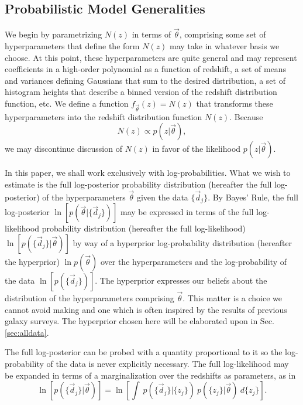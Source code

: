 \documentclass[preprint]{aastex}
\begin{document}
%
\subsection{Probabilistic Model Generalities}
\label{sec:prob}

We begin by parametrizing $N(z)$ in terms of $\vec{\theta}$, comprising some 
set of hyperparameters that define the form $N(z)$ may take in whatever basis 
we choose.  At this point, these hyperparameters are quite general and may 
represent coefficients in a high-order polynomial as a function of redshift, a 
set of means and variances defining Gaussians that sum to the desired 
distribution, a set of histogram heights that describe a binned version of the 
redshift distribution function, etc.  We define a function 
$f_{\vec{\theta}}(z)=N(z)$ that transforms these hyperparameters into the 
redshift distribution function $N(z)$.  Because 
\begin{equation}
\label{eq:definition}
N(z)\propto p(z|\vec{\theta}),
\end{equation}
we may discontinue discussion of $N(z)$ in favor of the likelihood 
$p(z|\vec{\theta})$.

In this paper, we shall work exclusively with log-probabilities.  What we wish 
to estimate is the full log-posterior probability distribution (hereafter the 
full log-posterior) of the hyperparameters $\vec{\theta}$ given the data 
$\{\vec{d}_{j}\}$.  By Bayes' Rule, the full log-posterior 
$\ln[p(\vec{\theta}|\{\vec{d}_{j}\})]$ may be expressed in terms of the full 
log-likelihood probability distribution (hereafter the full log-likelihood) 
$\ln[p(\{\vec{d}_{j}\}|\vec{\theta})]$ by way of a hyperprior log-probability 
distribution (hereafter the hyperprior) $\ln p(\vec{\theta})$ over the 
hyperparameters and the log-probability of the data $\ln[p(\{\vec{d}_{j}\})]$.  
The hyperprior expresses our beliefs about the distribution of the 
hyperparameters comprising $\vec{\theta}$.  This matter is a choice we cannot 
avoid making and one which is often inspired by the results of previous galaxy 
surveys.  The hyperprior chosen here will be elaborated upon in Sec. 
\ref{sec:alldata}.

The full log-posterior can be probed with a quantity proportional to it so the 
log-probability of the data is never explicitly necessary.  The full 
log-likelihood may be expanded in terms of a marginalization over the redshifts 
as parameters, as in 
\begin{equation}
\label{eq:marginalize}
\ln[p(\{\vec{d}_{j}\}|\vec{\theta})] = \ln\left[\int\ 
p(\{\vec{d}_{j}\}|\{z_{j}\})\ p(\{z_{j}\}|\vec{\theta})\ d\{z_{j}\}\right].
\end{equation}
\end{document}
